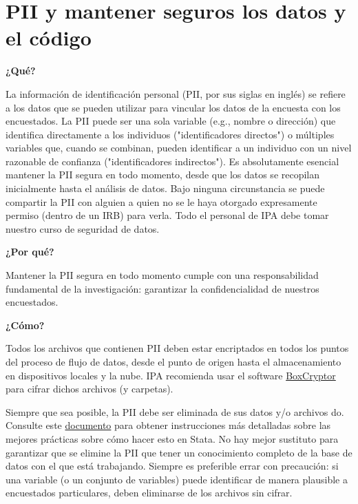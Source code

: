 \documentclass[11pt,en]{elegantpaper}
\begin{document}
\newpage 
\section{PII y mantener seguros los datos y el código}
\label{sec:pii}

\noindent
\textbf{¿Qué?}

La información de identificación personal (PII, por sus siglas en inglés) se refiere a los datos que se pueden utilizar para vincular los datos de la encuesta con los encuestados. La PII puede ser una sola variable (e.g., nombre o dirección) que identifica directamente a los individuos ("identificadores directos") o múltiples variables que, cuando se combinan, pueden identificar a un individuo con un nivel razonable de confianza ("identificadores indirectos"). Es absolutamente esencial mantener la PII segura en todo momento, desde que los datos se recopilan inicialmente hasta el análisis de datos. Bajo ninguna circunstancia se puede compartir la PII con alguien a quien no se le haya otorgado expresamente permiso (dentro de un IRB) para verla. Todo el personal de IPA debe tomar nuestro curso de seguridad de datos.

\noindent
\textbf{¿Por qué?}

Mantener la PII segura en todo momento cumple con una responsabilidad fundamental de la investigación: garantizar la confidencialidad de nuestros encuestados.

\noindent
\textbf{¿Cómo?} 

Todos los archivos que contienen PII deben estar encriptados en todos los puntos del proceso de flujo de datos, desde el punto de origen hasta el almacenamiento en dispositivos locales y la nube. IPA recomienda usar el software \href{https://www.boxcryptor.com/}{BoxCryptor} para cifrar dichos archivos (y carpetas).

Siempre que sea posible, la PII debe ser eliminada de sus datos y/o archivos do. Consulte este \href{http://www.poverty-action.org/research-transparency/pii-searching}{documento} para obtener instrucciones más detalladas sobre las mejores prácticas sobre cómo hacer esto en Stata. No hay mejor sustituto para garantizar que se elimine la PII que tener un conocimiento completo de la base de datos con el que está trabajando. Siempre es preferible errar con precaución: si una variable (o un conjunto de variables) puede identificar de manera plausible a encuestados particulares, deben eliminarse de los archivos sin cifrar.
\end{document}
